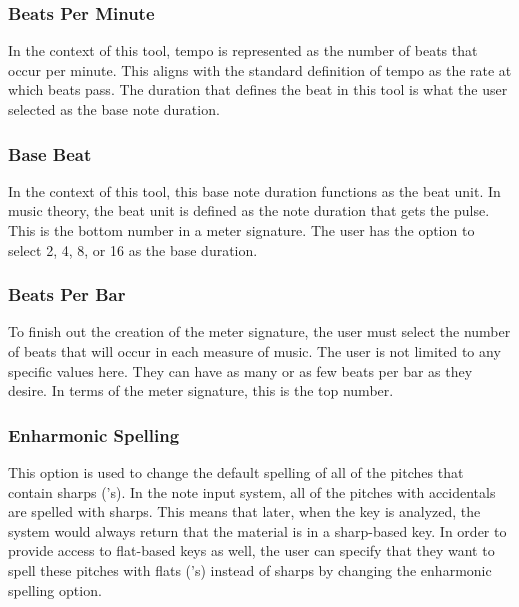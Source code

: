 \subsubsection{Beats Per Minute}
\label{subsubsec:beatsperminute}

In the context of this tool, tempo is represented as the number of beats that occur per minute.  This aligns with the standard definition of tempo as the rate at which beats pass.  The duration that defines the beat in this tool is what the user selected as the base note duration.

\subsubsection{Base Beat}
\label{subsubsec:basebeat}

In the context of this tool, this base note duration functions as the beat unit.  In music theory, the beat unit is defined as the note duration that gets the pulse.  This is the bottom number in a meter signature.  The user has the option to select 2, 4, 8, or 16 as the base duration.

\subsubsection{Beats Per Bar}
\label{subsubsec:beatsperbar}

To finish out the creation of the meter signature, the user must select the number of beats that will occur in each measure of music.  The user is not limited to any specific values here.  They can have as many or as few beats per bar as they desire.  In terms of the meter signature, this is the top number.

\subsubsection{Enharmonic Spelling}
\label{subsubsec:enharmonicspelling}

This option is used to change the default spelling of all of the pitches that contain sharps (\sh 's).  In the note input system, all of the pitches with accidentals are spelled with sharps.  This means that later, when the key is analyzed, the system would always return that the material is in a sharp-based key.  In order to provide access to flat-based keys as well, the user can specify that they want to spell these pitches with flats (\fl 's) instead of sharps by changing the enharmonic spelling option.

